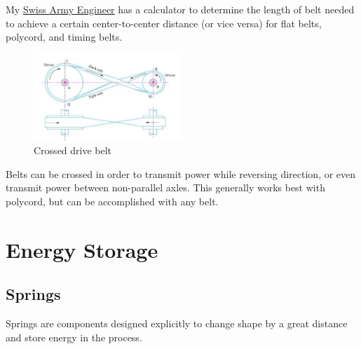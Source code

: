 My \href{http://thaddeus-maximus.github.io/swissarmyengineer/}{\color{red}\underline{Swiss Army Engineer}} has a calculator to determine the length of belt needed to achieve a certain center-to-center distance (or vice versa) for flat belts, polycord, and timing belts.

\begin{figure}[H]
	\includegraphics[width=0.5\textwidth]{imgs/belt_crossed.png}
	\caption{Crossed drive belt}
\end{figure}
	Belts can be crossed in order to transmit power while reversing direction, or even transmit power between non-parallel axles. This generally works best with polycord, but can be accomplished with any belt.
	
	
\section{Energy Storage} \label{section:energy_storage}

\subsection{Springs} \label{section:springs} 
	Springs are components designed explicitly to change shape by a great distance and store energy in the process.
	
